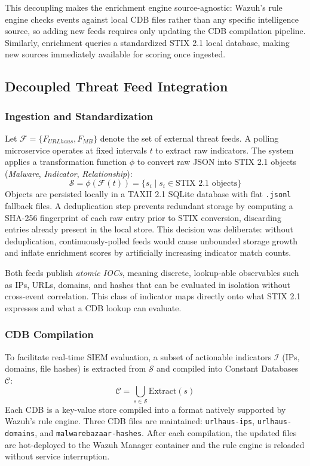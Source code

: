 \documentclass[conference]{IEEEtran}
\begin{document}
This decoupling makes the enrichment engine source-agnostic: Wazuh's rule engine checks events against local CDB files rather than any specific intelligence source, so adding new feeds requires only updating the CDB compilation pipeline. Similarly, enrichment queries a standardized STIX 2.1 local database, making new sources immediately available for scoring once ingested.

\subsection{Decoupled Threat Feed Integration}

\subsubsection{Ingestion and Standardization}
Let $\mathcal{F} = \{F_{URLhaus}, F_{MB}\}$ denote the set of external threat feeds. A polling microservice operates at fixed intervals $t$ to extract raw indicators. The system applies a transformation function $\phi$ to convert raw JSON into STIX 2.1 objects (\textit{Malware}, \textit{Indicator}, \textit{Relationship}):
\begin{equation}
\mathcal{S} = \phi(\mathcal{F}(t)) = \{s_i \mid s_i \in \text{STIX 2.1 objects}\}
\end{equation}
Objects are persisted locally in a TAXII 2.1 SQLite database with flat \texttt{.jsonl} fallback files. A deduplication step prevents redundant storage by computing a SHA-256 fingerprint of each raw entry prior to STIX conversion, discarding entries already present in the local store. This decision was deliberate: without deduplication, continuously-polled feeds would cause unbounded storage growth and inflate enrichment scores by artificially increasing indicator match counts.

Both feeds publish \textit{atomic IOCs}, meaning discrete, lookup-able observables such as IPs, URLs, domains, and hashes that can be evaluated in isolation without cross-event correlation. This class of indicator maps directly onto what STIX 2.1 expresses and what a CDB lookup can evaluate.

\subsubsection{CDB Compilation}
To facilitate real-time SIEM evaluation, a subset of actionable indicators $\mathcal{I}$ (IPs, domains, file hashes) is extracted from $\mathcal{S}$ and compiled into Constant Databases $\mathcal{C}$:
\begin{equation}
\mathcal{C} = \bigcup_{s \in \mathcal{S}} \text{Extract}(s)
\end{equation}
Each CDB is a key-value store compiled into a format natively supported by Wazuh's rule engine. Three CDB files are maintained: \texttt{urlhaus-ips}, \texttt{urlhaus-domains}, and \texttt{malwarebazaar-hashes}. After each compilation, the updated files are hot-deployed to the Wazuh Manager container and the rule engine is reloaded without service interruption.
\end{document}
